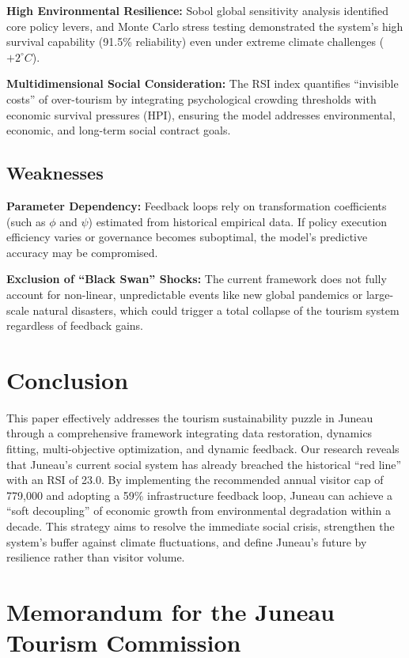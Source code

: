 \documentclass{mcmthesis}
\begin{document}
\textbf{High Environmental Resilience:} Sobol global sensitivity analysis identified core policy levers, and Monte Carlo stress testing demonstrated the system's high survival capability (91.5\% reliability) even under extreme climate challenges ($+2^\circ C$).

\textbf{Multidimensional Social Consideration:} The RSI index quantifies ``invisible costs'' of over-tourism by integrating psychological crowding thresholds with economic survival pressures (HPI), ensuring the model addresses environmental, economic, and long-term social contract goals.

\subsection{Weaknesses}

\textbf{Parameter Dependency:} Feedback loops rely on transformation coefficients (such as $\phi$ and $\psi$) estimated from historical empirical data. If policy execution efficiency varies or governance becomes suboptimal, the model's predictive accuracy may be compromised.

\textbf{Exclusion of ``Black Swan'' Shocks:} The current framework does not fully account for non-linear, unpredictable events like new global pandemics or large-scale natural disasters, which could trigger a total collapse of the tourism system regardless of feedback gains.

\section{Conclusion}
This paper effectively addresses the tourism sustainability puzzle in Juneau through a comprehensive framework integrating data restoration, dynamics fitting, multi-objective optimization, and dynamic feedback. Our research reveals that Juneau's current social system has already breached the historical ``red line'' with an RSI of 23.0. By implementing the recommended annual visitor cap of 779,000 and adopting a 59\% infrastructure feedback loop, Juneau can achieve a ``soft decoupling'' of economic growth from environmental degradation within a decade. This strategy aims to resolve the immediate social crisis, strengthen the system's buffer against climate fluctuations, and define Juneau's future by resilience rather than visitor volume.

\newpage
\section{Memorandum for the Juneau Tourism Commission}
\end{document}
